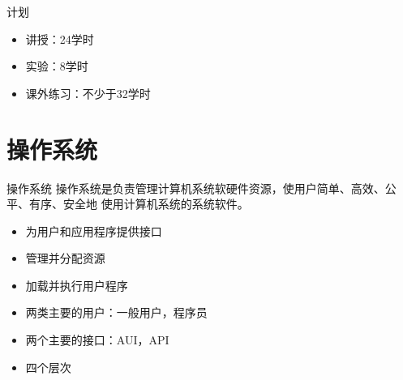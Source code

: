\begin{frame}{计划}
\begin{itemize}
  \item 讲授：24学时
  \item 实验：8学时
  \item 课外练习：不少于32学时
\end{itemize}
\end{frame}


\section{操作系统}
\begin{frame}{操作系统}
操作系统是负责管理计算机系统软硬件资源，使用户简单、高效、公平、有序、安全地
使用计算机系统的系统软件。
\begin{itemize}
	\item 为用户和应用程序提供接口
	\item 管理并分配资源
	\item 加载并执行用户程序
\end{itemize}
\end{frame}

\begin{frame}
\begin{itemize} 
  \item 两类主要的用户：一般用户，程序员
  \item 两个主要的接口：AUI，API
  \item 四个层次
\end{itemize}
\end{frame}

